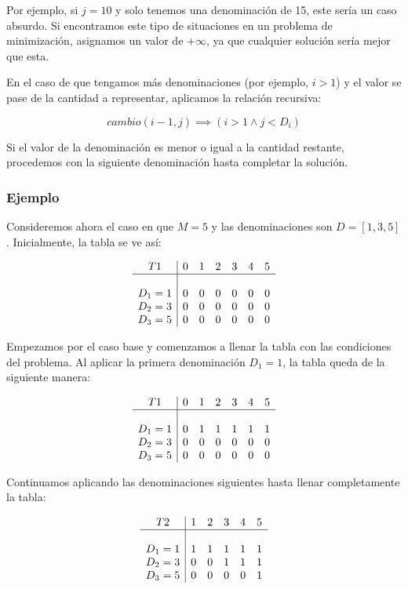 \documentclass[tikz,11pt,fleqn]{book} %
\begin{document}
Por ejemplo, si $j=10$ y solo tenemos una denominación de 15, este sería un caso absurdo. Si encontramos este tipo de situaciones en un problema de minimización, asignamos un valor de $+\infty$, ya que cualquier solución sería mejor que esta.

En el caso de que tengamos más denominaciones (por ejemplo, $i > 1$) y el valor se pase de la cantidad a representar, aplicamos la relación recursiva:

$$
cambio(i-1, j) \implies (i > 1 \land j < D_i)
$$

Si el valor de la denominación es menor o igual a la cantidad restante, procedemos con la siguiente denominación hasta completar la solución.

\subsubsection{Ejemplo}

Consideremos ahora el caso en que $M=5$ y las denominaciones son $D=[1, 3, 5]$. Inicialmente, la tabla se ve así:

\[
\begin{array}{c|cccccc}
    T1 & 0 & 1 & 2 & 3 & 4 & 5\\
    \hline\\
    D_1=1 & 0 & 0 & 0 & 0 & 0 & 0 \\
    D_2=3 & 0 & 0 & 0 & 0 & 0 & 0 \\
    D_3=5 & 0 & 0 & 0 & 0 & 0 & 0 \\
\end{array}
\]

Empezamos por el caso base y comenzamos a llenar la tabla con las condiciones del problema. Al aplicar la primera denominación $D_1=1$, la tabla queda de la siguiente manera:

\[
\begin{array}{c|cccccc}
    T1 & 0 & 1 & 2 & 3 & 4 & 5\\
    \hline\\
    D_1=1 & 0 & 1 & 1 & 1 & 1 & 1 \\
    D_2=3 & 0 & 0 & 0 & 0 & 0 & 0 \\
    D_3=5 & 0 & 0 & 0 & 0 & 0 & 0 \\
\end{array}
\]

Continuamos aplicando las denominaciones siguientes hasta llenar completamente la tabla:

\[
\begin{array}{c|cccccc}
    T2 & 1 & 2 & 3 & 4 & 5\\
    \hline\\
    D_1=1 & 1 & 1 & 1 & 1 & 1 \\
    D_2=3 & 0 & 0 & 1 & 1 & 1 \\
    D_3=5 & 0 & 0 & 0 & 0 & 1 \\
\end{array}
\]
\end{document}
